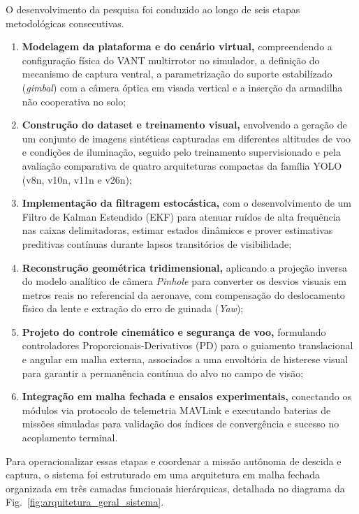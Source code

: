 O desenvolvimento da pesquisa foi conduzido ao longo de seis etapas metodológicas consecutivas.
\begin{enumerate}
    \item \textbf{Modelagem da plataforma e do cenário virtual,} compreendendo a configuração física do VANT multirrotor no simulador, a definição do mecanismo de captura ventral, a parametrização do suporte estabilizado (\textit{gimbal}) com a câmera óptica em visada vertical e a inserção da armadilha não cooperativa no solo;
    
    \item \textbf{Construção do dataset e treinamento visual,} envolvendo a geração de um conjunto de imagens sintéticas capturadas em diferentes altitudes de voo e condições de iluminação, seguido pelo treinamento supervisionado e pela avaliação comparativa de quatro arquiteturas compactas da família YOLO (v8n, v10n, v11n e v26n);
    
    \item \textbf{Implementação da filtragem estocástica,} com o desenvolvimento de um Filtro de Kalman Estendido (EKF) para atenuar ruídos de alta frequência nas caixas delimitadoras, estimar estados dinâmicos e prover estimativas preditivas contínuas durante lapsos transitórios de visibilidade;
    
    \item \textbf{Reconstrução geométrica tridimensional,} aplicando a projeção inversa do modelo analítico de câmera \textit{Pinhole} para converter os desvios visuais em metros reais no referencial da aeronave, com compensação do deslocamento físico da lente e extração do erro de guinada (\textit{Yaw});
    
    \item \textbf{Projeto do controle cinemático e segurança de voo,} formulando controladores Proporcionais-Derivativos (PD) para o guiamento translacional e angular em malha externa, associados a uma envoltória de histerese visual para garantir a permanência contínua do alvo no campo de visão;
    
    \item \textbf{Integração em malha fechada e ensaios experimentais,} conectando os módulos via protocolo de telemetria MAVLink e executando baterias de missões simuladas para validação dos índices de convergência e sucesso no acoplamento terminal.
\end{enumerate}

Para operacionalizar essas etapas e coordenar a missão autônoma de descida e captura, o sistema foi estruturado em uma arquitetura em malha fechada organizada em três camadas funcionais hierárquicas, detalhada no diagrama da Fig.~\ref{fig:arquitetura_geral_sistema}.

